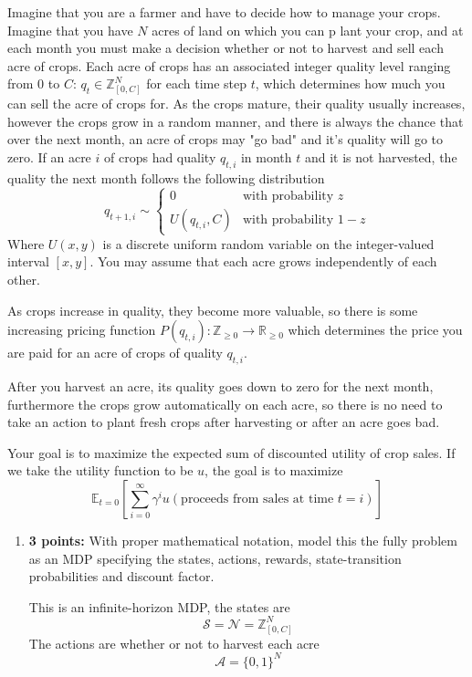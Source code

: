 \documentclass[12pt]{exam}
\begin{document}
\begin{questions}

Imagine that you are a farmer and have to decide how to manage your crops. Imagine that you have $N$ acres of land on which you can p lant your crop, and at each month you must make a decision whether or not to harvest and sell each acre of crops. Each acre of crops has an associated integer quality level ranging from 0 to $C$: $q_t \in \mathbb{Z}_{[0, C]}^N$ for each time step $t$, which determines how much you can sell the acre of crops for. As the crops mature, their quality usually increases, however the crops grow in a random manner, and there is always the chance that over the next month, an acre of crops may "go bad" and it's quality will go to zero. If an acre $i$ of crops had quality $q_{t,i}$ in month $t$ and it is not harvested, the quality the next month follows the following distribution
\[q_{t+1,i} \sim \begin{cases} 0 &\text{with probability } z \\
U(q_{t,i}, C) & \text{with probability } 1-z \end{cases}\]
Where $U(x, y)$ is a discrete uniform random variable on the integer-valued interval $[x,y]$. You may assume that each acre grows independently of each other.

As crops increase in quality, they become more valuable, so there is some increasing pricing function $P(q_{t,i}): \mathbb{Z}_{\geq 0} \rightarrow \mathbb{R}_{\geq 0}$ which determines the price you are paid for an acre of crops of quality $q_{t,i}$. 

After you harvest an acre, its quality goes down to zero for the next month, furthermore the crops grow automatically on each acre, so there is no need to take an action to plant fresh crops after harvesting or after an acre goes bad.

Your goal is to maximize the expected sum of discounted utility of crop sales. If we take the utility function to be $u$, the goal is to maximize
\[\mathbb{E}_{t=0}[\sum_{i=0}^{\infty} \gamma^i u(\text{proceeds from sales at time } t=i)]\]

\begin{enumerate}

\item {\bf 3 points: } With proper mathematical notation, model this the fully problem as an MDP specifying the states, actions, rewards, state-transition probabilities and discount factor. 
\begin{solution}
This is an infinite-horizon MDP, the states are 
\[\mathcal{S} = \mathcal{N} = \mathbb{Z}_{[0, C]}^N\]
The actions are whether or not to harvest each acre
\[\mathcal{A} = \{0,1\}^N\]


\end{solution}
\end{enumerate}
\end{questions}
\end{document}
